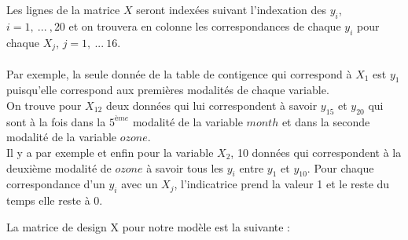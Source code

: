 \documentclass[french,12pt]{report}
\newcommand{\<}{\langle}
\renewcommand{\>}{\rangle}
\theoremstyle{definition}
\begin{document}
Les lignes de la matrice $X$ seront indexées suivant l'indexation des $y_i$, $i=1,\ ...\ ,20$ et on trouvera en colonne les correspondances de chaque $y_i$ pour chaque $X_j$, $j=1, \ ... \ 16$.\\
\\
Par exemple, la seule donnée de la table de contigence qui correspond à $X_1$ est $y_1$ puisqu'elle correspond aux premières modalités de chaque variable.\\
On trouve pour $X_{12}$ deux données qui lui correspondent à savoir $y_{15}$ et $y_{20}$ qui sont à la fois dans la $5^{ème}$ modalité de la variable $month$ et dans la seconde modalité de la variable $ozone$.\\
Il y a par exemple et enfin pour la variable $X_{2}$, 10 données qui correspondent à la deuxième modalité de $ozone$ à savoir tous les $y_i$ entre $y_1$ et $y_{10}$. 
Pour chaque correspondance d'un $y_i$ avec un $X_j$, l'indicatrice prend la valeur 1 et le reste du temps elle reste à 0.\\

\newpage

La matrice de design X pour notre modèle est la suivante : \\
\\
\end{document}
